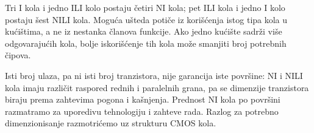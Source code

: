 Tri I kola i jedno ILI kolo postaju četiri NI kola; pet ILI kola i jedno I kolo postaju šest NILI kola. Moguća ušteda potiče iz korišćenja istog tipa kola u kućištima, a ne iz nestanka članova funkcije. Ako jedno kućište sadrži više odgovarajućih kola, bolje iskorišćenje tih kola može smanjiti broj potrebnih čipova.

Isti broj ulaza, pa ni isti broj tranzistora, nije garancija iste površine: NI i NILI kola imaju različit raspored rednih i paralelnih grana, pa se dimenzije tranzistora biraju prema zahtevima pogona i kašnjenja. Prednost NI kola po površini razmatramo za uporedivu tehnologiju i zahteve rada. Razlog za potrebno dimenzionisanje razmotrićemo uz strukturu CMOS kola.

